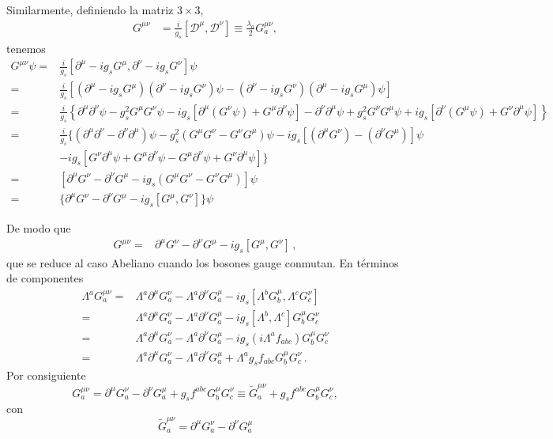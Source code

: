 Similarmente, definiendo la matriz $3\times 3$, 
\begin{align}
  \label{eq:gmunu}
  {{G}}^{\mu\nu}&=\frac{i}{g_s}[\mathcal{D}^\mu,\mathcal{D}^\nu]\equiv\frac{\lambda_a}{2}G^{\mu\nu}_a,
\end{align}
tenemos
\begin{align}
  \label{eq:164qft}
   {G}^{\mu\nu}\psi =&\frac{i}{g_s}[\partial^\mu-ig_sG^\mu,\partial^\nu-ig_sG^\nu]\psi\nonumber\\
  =&\frac{i}{g_s}\left[\left(\partial^\mu-ig_sG^\mu\right)\left(\partial^\nu-ig_sG^\nu\right)\psi
    -\left(\partial^\nu-ig_sG^\nu\right)\left(\partial^\mu-ig_sG^\mu\right)\psi\right]\nonumber\\
  =&\frac{i}{g_s}\left\{\partial^\mu\partial^\nu\psi-g_s^2G^\mu G^\nu\psi-ig_s[\partial^\mu(G^\nu\psi)+G^\mu\partial^\nu\psi]
    -\partial^\nu\partial^\mu\psi+g_s^2G^\nu G^\mu\psi+ig_s[\partial^\nu(G^\mu\psi)+G^\nu\partial^\mu\psi]\right\}\nonumber\\
  =&\frac{i}{g_s}\{(\partial^\mu\partial^\nu-\partial^\nu\partial^\mu)\psi-g_s^2(G^\mu G^\nu-G^\nu G^\mu)\psi
  -ig_s[(\partial^\mu G^\nu)-(\partial^\nu G^\mu)]\psi\nonumber\\
  &-ig_s[G^\nu\partial^\mu\psi+G^\mu\partial^\nu\psi-G^\mu\partial^\nu\psi+G^\nu\partial^\mu\psi]\}\nonumber\\
=&[\partial^\mu G^\nu-\partial^\nu G^\mu-ig_s(G^\mu G^\nu-G^\nu G^\mu)]\psi\nonumber\\
=&\{\partial^\mu G^\nu-\partial^\nu G^\mu-ig_s[G^\mu,G^\nu]\}\psi
\end{align}

De modo que
\begin{align}
  {G}^{\mu\nu}=&\partial^\mu G^\nu-\partial^\nu G^\mu-ig_s[G^\mu,G^\nu]\,,
\end{align}
que se reduce al caso Abeliano cuando los bosones gauge conmutan. En términos de componentes
\begin{align}
  \Lambda^a{G}^{\mu\nu}_a=&\Lambda^a\partial^\mu G^\nu_a-\Lambda^a\partial^\nu G^\mu_a-ig_s[\Lambda^bG^\mu_b,\Lambda^cG^\nu_c]\nonumber\\
  =&\Lambda^a\partial^\mu G^\nu_a-\Lambda^a\partial^\nu G^\mu_a-ig_s[\Lambda^b,\Lambda^c]G^\mu_bG^\nu_c\nonumber\\
  =&\Lambda^a\partial^\mu G^\nu_a-\Lambda^a\partial^\nu G^\mu_a-ig_s(i\Lambda^af_{a b c})G^\mu_bG^\nu_c\nonumber\\
  =&\Lambda^a\partial^\mu G^\nu_a-\Lambda^a\partial^\nu G^\mu_a+\Lambda^ag_sf_{a b c}G^\mu_bG^\nu_c\,.
\end{align}
Por consiguiente
\begin{equation}
  \label{eq:258qftold}
  G^{\mu\nu}_a=\partial^\mu G^\nu_a-\partial^\nu G^\mu_a+g_s f^{abc}G^\mu_b G^\nu_c\equiv\widetilde{G}^{\mu\nu}_a+g_s f^{abc}G^\mu_b G^\nu_c,
\end{equation}
con
\begin{equation}
  \widetilde{G}^{\mu\nu}_a=\partial^\mu G^\nu_a-\partial^\nu G^\mu_a
\end{equation}




